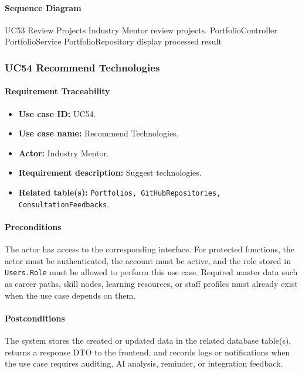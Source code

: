 \paragraph{Sequence Diagram}

\SequenceDiagram
{UC53 Review Projects}
{Industry Mentor}
{review projects.}
{PortfolioController}
{PortfolioService}
{PortfolioRepository}
{display processed result}

\subsubsection{UC54 Recommend Technologies}

\paragraph{Requirement Traceability}

\begin{itemize}
    \item \textbf{Use case ID:} UC54.
    \item \textbf{Use case name:} Recommend Technologies.
    \item \textbf{Actor:} Industry Mentor.
    \item \textbf{Requirement description:} Suggest technologies.
    \item \textbf{Related table(s):} \texttt{Portfolios, GitHubRepositories, ConsultationFeedbacks}.
\end{itemize}

\paragraph{Preconditions}

The actor has access to the corresponding interface. For protected functions, the actor must be authenticated, the account must be active, and the role stored in \texttt{Users.Role} must be allowed to perform this use case. Required master data such as career paths, skill nodes, learning resources, or staff profiles must already exist when the use case depends on them.

\paragraph{Postconditions}

The system stores the created or updated data in the related database table(s), returns a response DTO to the frontend, and records logs or notifications when the use case requires auditing, AI analysis, reminder, or integration feedback.

